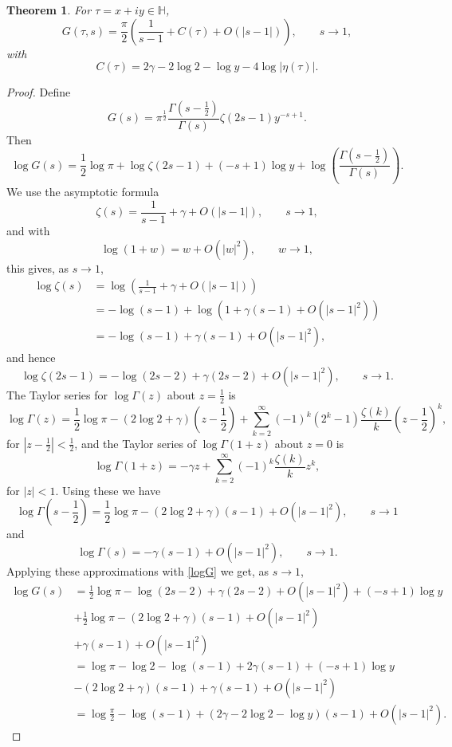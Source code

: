 \documentclass{article}
\newtheorem{theorem}{Theorem}
\theoremstyle{definition}
\begin{document}
\begin{theorem}
For $\tau =x+iy \in \mathbb{H}$,
\[
G(\tau,s) = \frac{\pi}{2}\left(\frac{1}{s-1}+C(\tau)+O(|s-1|)\right), \qquad s \to 1,
\]
with
\[
C(\tau)=2\gamma-2\log 2-\log y - 4 \log|\eta(\tau)|.
\]
\end{theorem}
\begin{proof}
Define
\[
G(s) = \pi^{\frac{1}{2}} \frac{\Gamma\left(s-\frac{1}{2}\right)}{\Gamma(s)} \zeta(2s-1) y^{-s+1}.
\]
Then
\begin{equation}
\log G(s)=\frac{1}{2}\log \pi+\log \zeta(2s-1)+(-s+1)\log y +\log\left( \frac{\Gamma\left(s-\frac{1}{2}\right)}{\Gamma(s)} \right).
\label{logG}
\end{equation}
We use the asymptotic formula
\[
\zeta(s)= \frac{1}{s-1}+\gamma+O(|s-1|), \qquad s \to 1,
\]
and with
\[
\log(1+w)=w+O(|w|^2), \qquad w \to 1,
\]
this gives,
as $s \to 1$,
\begin{align*}
\log \zeta(s) &=  \log\left(\frac{1}{s-1}+\gamma+O(|s-1|)\right)\\
&=-\log(s-1)+\log(1+\gamma(s-1)+O(|s-1|^2))\\
&=-\log(s-1)+\gamma(s-1)+O(|s-1|^2),
\end{align*}
and hence
\[
\log \zeta(2s-1) = -\log(2s-2)+\gamma(2s-2)+O(|s-1|^2), \qquad s \to 1.
\]
The Taylor series for $\log \Gamma(z)$ about $z=\frac{1}{2}$ is
\[
\log \Gamma(z) = \frac{1}{2} \log \pi - (2\log 2+\gamma)\left(z-\frac{1}{2}\right)
+\sum_{k=2}^\infty (-1)^k (2^k-1) \frac{\zeta(k)}{k} \left(z-\frac{1}{2}\right)^k,
\]
for $|z-\frac{1}{2}|<\frac{1}{2}$, and the Taylor series of $\log \Gamma(1+z)$ about $z=0$ is
\[
\log \Gamma(1+z) = -\gamma z + \sum_{k=2}^\infty (-1)^k \frac{\zeta(k)}{k} z^k,
\]
for $|z|<1$. Using these we have
\[
\log \Gamma\left(s-\frac{1}{2}\right) = \frac{1}{2}\log \pi - (2\log 2 +\gamma)(s-1)
+O(|s-1|^2), \qquad s \to 1
\]
and
\[
\log \Gamma(s) = -\gamma(s-1)+O(|s-1|^2), \qquad s \to 1.
\]
Applying these approximations with \eqref{logG} we get, as $s \to 1$,
\begin{align*}
\log G(s)&=\frac{1}{2}\log \pi-\log(2s-2)+\gamma(2s-2)+O(|s-1|^2)+(-s+1)\log y\\
&+\frac{1}{2}\log \pi - (2\log 2 +\gamma)(s-1)
+O(|s-1|^2)\\
&+\gamma(s-1)+O(|s-1|^2)\\
&=\log \pi  - \log 2 - \log(s-1) + 2\gamma(s-1)+(-s+1)\log y\\
&-(2\log 2+\gamma)(s-1)+\gamma(s-1)+O(|s-1|^2)\\
&=\log \frac{\pi}{2} - \log (s-1) + (2\gamma-2\log 2-\log y)(s-1)+O(|s-1|^2).

\end{align*}
\end{proof}
\end{document}
